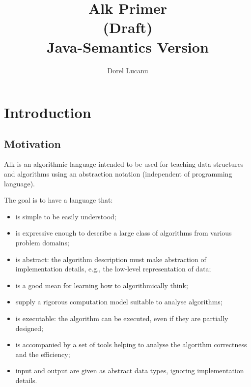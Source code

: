 \documentclass[a4paper]{report}
\title{Alk Primer \medskip\\ [2ex]
\large (Draft)\\[3ex]
\large Java-Semantics Version
}
\author{Dorel Lucanu}
\begin{document}
\maketitle

\chapter{Introduction}

\section{Motivation}

Alk is an algorithmic language intended to be used for teaching data structures and algorithms using an abstraction notation (independent of programming language).

The goal is to have a language that:
\begin{itemize}
\item is simple to be easily understood;
\item is expressive enough to describe a large class of algorithms from various problem domains;
\item is abstract: the algorithm description must make abstraction of implementation details, e.g., the low-level representation of data;
\item is a good mean for learning how to algorithmically think;
\item supply a rigorous computation model suitable to analyse algorithms;
\item is executable: the algorithm can be executed, even if they are partially designed;
\item is accompanied by a set of tools helping to analyse the algorithm correctness and the efficiency;
\item input and output are given as abstract data types, ignoring implementation details.
\end{itemize}
\end{document}
